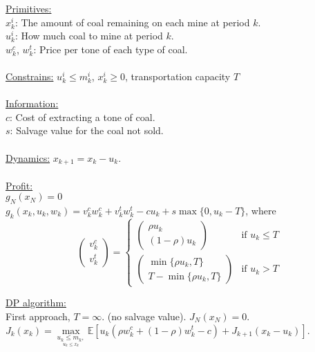 \documentclass[11pt, english]{article}
\begin{document}
\underline{Primitives:}\\
$x_k^i$: The amount of coal remaining on each mine at period $k$.\\
$u_k^i$: How much coal to mine at period $k$. \\
$w_k^c$, $w_k^t$: Price per tone of each type of coal.\\\\
\underline{Constrains:} $u_k^i\leq m_k^i$, $x_k^i\geq 0$, transportation capacity $T$\\\\
\underline{Information:}\\
$c$: Cost of extracting a tone of coal.\\
$s$: Salvage value for the coal not sold.\\\\
\underline{Dynamics:}
$x_{k+1}=x_k-u_k$.\\\\
\underline{Profit:}\\
$g_N(x_N)=0$\\
$g_k(x_k,u_k,w_k)=v_k^cw_k^c+v_k^tw_k^t-cu_k+s\max\{0,u_k-T\}$, where $$\left(\begin{array}{c}
v_k^c\\
v_k^t
\end{array}\right)=\left\{\begin{array}{ll}
\left(\begin{array}{c}
\rho u_k\\
(1-\rho)u_k
\end{array}\right) & \text{if } u_k\leq T\\
\left(\begin{array}{c}
\min\{\rho u_k,T\}\\
T-\min\{\rho u_k,T\}
\end{array}\right) & \text{if } u_k> T
\end{array}\right.$$

\underline{DP algorithm:}\\
First approach, $T=\infty$. (no salvage value).
$J_N(x_N)=0$.\\
$J_{k}(x_k)=\underset{\underset{u_{k}\leq x_{k}}{u_{k}\leq m_{k},}}{\max}\mathbb{E}[u_k(\rho w_k^c+(1-\rho)w_k^t-c)+J_{k+1}(x_k-u_k)]$.\\\\
\end{document}

